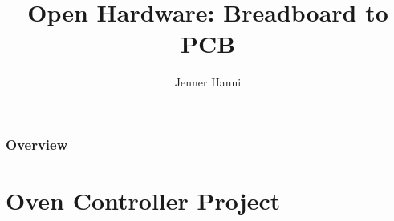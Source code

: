 \documentclass{beamer}
\title[Breadboard to PCB]{Open Hardware: Breadboard to PCB} %
\author{Jenner Hanni} %
\institute[Open Source Bridge 2014] %
{
Open Source Bridge 2014 \\ %
\medskip
\textit{jeh.wicker@gmail.com} 
}
\begin{document}
\begin{frame}
\titlepage %
\end{frame}

\begin{frame}
\frametitle{Overview} %
\tableofcontents %
\end{frame}


\section{Oven Controller Project} 
\end{document}
